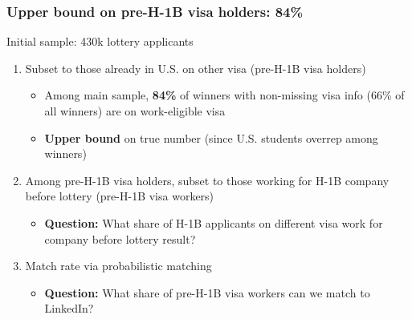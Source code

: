 \documentclass[xcolor=dvipsnames, compress, 12pt, aspectratio=169, handout]{beamer}
\begin{document}
\begin{frame}
    \frametitle{Upper bound on pre-H-1B visa holders: 84\%}
    Initial sample: 430k lottery applicants
    \vspace{3mm}
    \begin{enumerate}
        \item Subset to those already in U.S. on other visa (pre-H-1B visa holders)
        \begin{itemize}
            \item Among main sample, \textcolor{maincolor}{\textbf{84\%}} of winners with non-missing visa info (66\% of all winners) are on work-eligible visa
            \item \textbf{Upper bound} on true number (since U.S. students overrep among winners)
        \end{itemize}
        \vspace{3mm}
        \item Among pre-H-1B visa holders, subset to those working for H-1B company before lottery (pre-H-1B visa workers)
        \begin{itemize}
            \item \textbf{Question:} What share of H-1B applicants on different visa work for company before lottery result?
        \end{itemize}
        \vspace{3mm}
        \item Match rate via probabilistic matching
        \begin{itemize}
            \item \textbf{Question:} What share of pre-H-1B visa workers can we match to LinkedIn?
        \end{itemize} 
    \end{enumerate} 
\end{frame}
\end{document}

